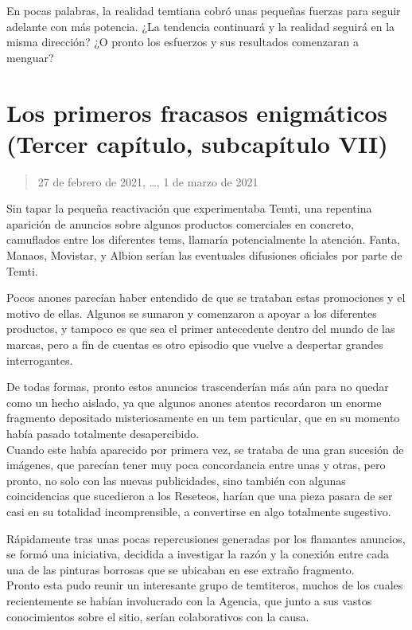 \documentclass[
  spanish,
]{book}
\begin{document}
En pocas palabras, la realidad temtiana cobró unas pequeñas fuerzas para seguir adelante con más potencia. ¿La tendencia continuará y la realidad seguirá en la misma dirección? ¿O pronto los esfuerzos y sus resultados comenzaran a menguar?

\hypertarget{los-primeros-fracasos-enigmuxe1ticos-tercer-capuxedtulo-subcapuxedtulo-vii}{%
\section{Los primeros fracasos enigmáticos (Tercer capítulo, subcapítulo VII)}\label{los-primeros-fracasos-enigmuxe1ticos-tercer-capuxedtulo-subcapuxedtulo-vii}}

\begin{quote}
27 de febrero de 2021, \ldots, 1 de marzo de 2021
\end{quote}

Sin tapar la pequeña reactivación que experimentaba Temti, una repentina aparición de anuncios sobre algunos productos comerciales en concreto, camuflados entre los diferentes tems, llamaría potencialmente la atención. Fanta, Manaos, Movistar, y Albion serían las eventuales difusiones oficiales por parte de Temti.

Pocos anones parecían haber entendido de que se trataban estas promociones y el motivo de ellas. Algunos se sumaron y comenzaron a apoyar a los diferentes productos, y tampoco es que sea el primer antecedente dentro del mundo de las marcas, pero a fin de cuentas es otro episodio que vuelve a despertar grandes interrogantes.

De todas formas, pronto estos anuncios trascenderían más aún para no quedar como un hecho aislado, ya que algunos anones atentos recordaron un enorme fragmento depositado misteriosamente en un tem particular, que en su momento había pasado totalmente desapercibido.\\
Cuando este había aparecido por primera vez, se trataba de una gran sucesión de imágenes, que parecían tener muy poca concordancia entre unas y otras, pero pronto, no solo con las nuevas publicidades, sino también con algunas coincidencias que sucedieron a los Reseteos, harían que una pieza pasara de ser casi en su totalidad incomprensible, a convertirse en algo totalmente sugestivo.

Rápidamente tras unas pocas repercusiones generadas por los flamantes anuncios, se formó una iniciativa, decidida a investigar la razón y la conexión entre cada una de las pinturas borrosas que se ubicaban en ese extraño fragmento.\\
Pronto esta pudo reunir un interesante grupo de temtiteros, muchos de los cuales recientemente se habían involucrado con la Agencia, que junto a sus vastos conocimientos sobre el sitio, serían colaborativos con la causa.
\end{document}
